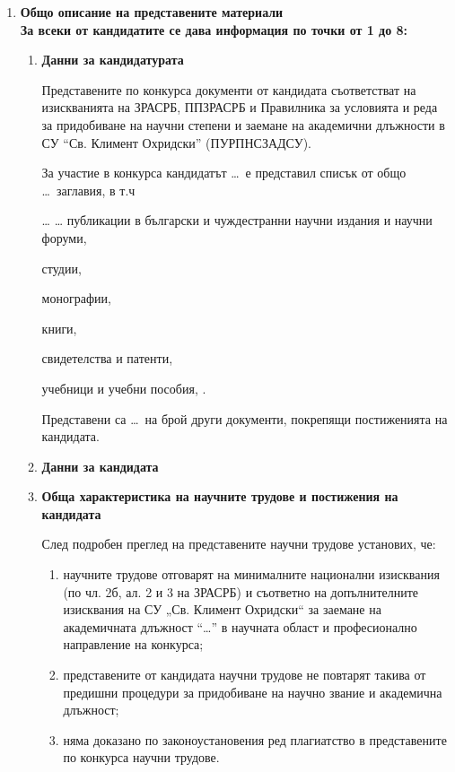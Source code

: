 \documentclass[a4paper]{report}
\def\assocprof{доцент}
\def\prof{професор}
\def\position{\ldots}          %
\def\candidatename{\ldots}                %
\def\titlecount{\ldots}                   %
\def\otherdocscount{\ldots}               %
\newcommand{\titletype}[2]{
  \ifx\testforempty#2\testforempty
  \relax
  \else
  #2 #1,
  \fi}
\newcommand{\papers}{\titletype{публикации в български и чуждестранни научни издания и научни форуми}}
\newcommand{\studia}{\titletype{студии}}
\newcommand{\monographs}{\titletype{монографии}}
\newcommand{\books}{\titletype{книги}}
\newcommand{\patents}{\titletype{свидетелства и патенти}}
\newcommand{\textbooks}{\titletype{учебници и учебни пособия}}
\begin{document}
\begin{enumerate}[label=\textbf{\Roman*.}]
\item \textbf{Общо описание на представените материали\\
    За всеки от кандидатите се дава информация по точки от 1 до 8:}

  \begin{enumerate}[label=\textbf{\arabic*.}]
  \item \textbf{Данни за кандидатурата}

    Представените по конкурса документи от кандидата съответстват на изискванията на ЗРАСРБ, ППЗРАСРБ и Правилника за условията и реда за придобиване на научни степени и заемане на академични длъжности в СУ ``Св. Климент Охридски'' (ПУРПНСЗАДСУ).

    За участие в конкурса кандидатът \candidatename\ е представил списък от общо \titlecount\ заглавия, в т.ч
    \papers{\ldots}
    \studia{}
    \monographs{}
    \books{}
    \patents{}
    \textbooks{}.

    Представени са \otherdocscount\ на брой други документи, покрепящи постиженията на кандидата.
    

    
  \item \textbf{Данни за кандидата}

  \item \textbf{Обща характеристика на научните трудове и постижения на кандидата}


    След подробен преглед на представените научни трудове установих, че:
    \begin{enumerate}[label=\alph*)]
    \item научните трудове отговарят на минималните национални изисквания (по чл. 2б, ал. 2 и 3 на ЗРАСРБ) и съответно на допълнителните изисквания на СУ „Св. Климент Охридски“ за заемане на академичната длъжност ``\position'' в научната област и професионално направление на конкурса;
    \item представените от кандидата научни трудове не повтарят такива от предишни процедури за придобиване на научно звание и академична длъжност;
    \item няма доказано по законоустановения ред плагиатство в представените по конкурса научни трудове.
    \end{enumerate}
    

\end{enumerate}
\end{enumerate}
\end{document}
